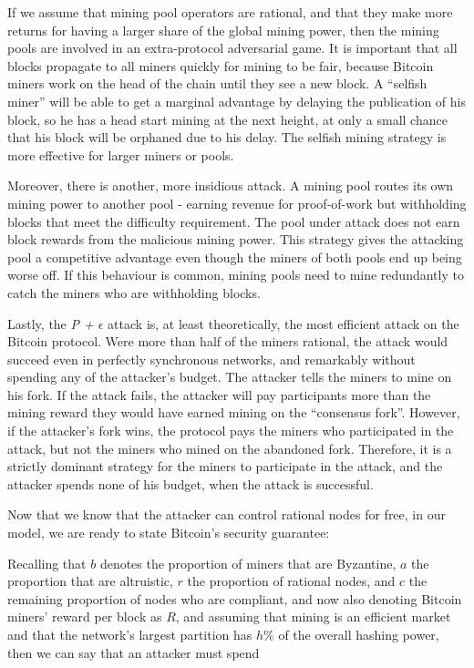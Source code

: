 \documentclass[11pt,a4paper]{article}
\theoremstyle{plain}
\theoremstyle{definition}
\begin{document}
If we assume that mining pool operators are rational, and that they make more returns for having a larger share of the global mining power, then the mining pools are involved in an extra-protocol adversarial game. It is important that all blocks propagate to all miners quickly for mining to be fair, because Bitcoin miners work on the head of the chain until they see a new block. A ``selfish miner'' will be able to get a marginal advantage by delaying the publication of his block, so he has a head start mining at the next height, at only a small chance that his block will be orphaned due to his delay. The selfish mining strategy is more effective for larger miners or pools. \cite{SelfishMining}

Moreover, there is another, more insidious attack.  A mining pool routes its own mining power to another pool - earning revenue for proof-of-work but withholding blocks that meet the difficulty requirement. The pool under attack does not earn block rewards from the malicious mining power. This strategy gives the attacking pool a competitive advantage even though the miners of both pools end up being worse off. If this behaviour is common, mining pools need to mine redundantly to catch the miners who are withholding blocks. \cite{BlockWithholding}

Lastly, the \emph{P + $\epsilon$} attack is, at least theoretically, the most efficient attack on the Bitcoin protocol. Were more than half of the miners rational, the attack would succeed even in perfectly synchronous networks, and remarkably without spending any of the attacker's budget. The attacker tells the miners to mine on his fork. If the attack fails, the attacker will pay participants more than the mining reward they would have earned mining on the ``consensus fork''. However, if the attacker's fork wins, the protocol pays the miners who participated in the attack, but not the miners who mined on the abandoned fork. Therefore, it is a strictly dominant strategy for the miners to participate in the attack, and the attacker spends none of his budget, when the attack is successful. \cite{P_Plus_Epsilon}

Now that we know that the attacker can control rational nodes for free, in our model, we are ready to state Bitcoin's security guarantee:

Recalling that $b$ denotes the proportion of miners that are Byzantine, $a$ the proportion that are altruistic, $r$ the proportion of rational nodes, and $c$ the remaining proportion of nodes who are compliant, and now also denoting Bitcoin miners' reward per block as $R$, and assuming that mining is an efficient market and that the network's largest partition has $h\%$ of the overall hashing power, then we can say that an attacker must spend 
\end{document}
